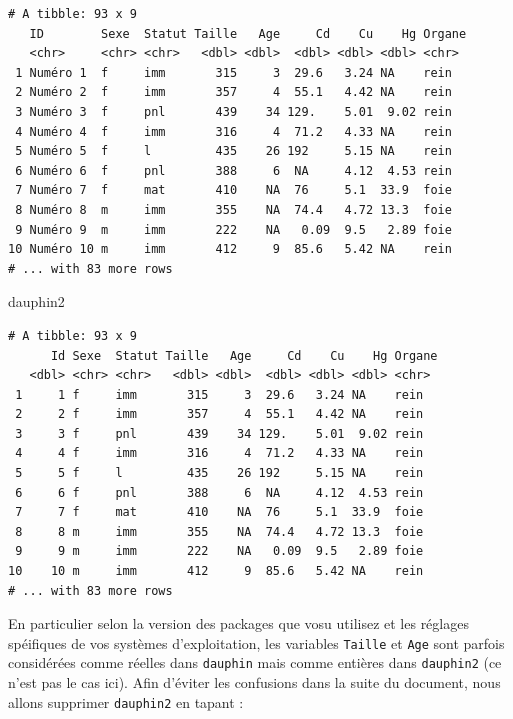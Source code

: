 \documentclass[
  a4paper,
]{article}
\newenvironment{Shaded}{\begin{snugshade}}{\end{snugshade}}
\newcommand{\NormalTok}[1]{\textcolor[rgb]{0.12,0.11,0.11}{#1}}
\begin{document}
\begin{verbatim}
# A tibble: 93 x 9
   ID        Sexe  Statut Taille   Age     Cd    Cu    Hg Organe
   <chr>     <chr> <chr>   <dbl> <dbl>  <dbl> <dbl> <dbl> <chr> 
 1 Numéro 1  f     imm       315     3  29.6   3.24 NA    rein  
 2 Numéro 2  f     imm       357     4  55.1   4.42 NA    rein  
 3 Numéro 3  f     pnl       439    34 129.    5.01  9.02 rein  
 4 Numéro 4  f     imm       316     4  71.2   4.33 NA    rein  
 5 Numéro 5  f     l         435    26 192     5.15 NA    rein  
 6 Numéro 6  f     pnl       388     6  NA     4.12  4.53 rein  
 7 Numéro 7  f     mat       410    NA  76     5.1  33.9  foie  
 8 Numéro 8  m     imm       355    NA  74.4   4.72 13.3  foie  
 9 Numéro 9  m     imm       222    NA   0.09  9.5   2.89 foie  
10 Numéro 10 m     imm       412     9  85.6   5.42 NA    rein  
# ... with 83 more rows
\end{verbatim}

\begin{Shaded}
\begin{Highlighting}[]
\NormalTok{dauphin2}
\end{Highlighting}
\end{Shaded}

\begin{verbatim}
# A tibble: 93 x 9
      Id Sexe  Statut Taille   Age     Cd    Cu    Hg Organe
   <dbl> <chr> <chr>   <dbl> <dbl>  <dbl> <dbl> <dbl> <chr> 
 1     1 f     imm       315     3  29.6   3.24 NA    rein  
 2     2 f     imm       357     4  55.1   4.42 NA    rein  
 3     3 f     pnl       439    34 129.    5.01  9.02 rein  
 4     4 f     imm       316     4  71.2   4.33 NA    rein  
 5     5 f     l         435    26 192     5.15 NA    rein  
 6     6 f     pnl       388     6  NA     4.12  4.53 rein  
 7     7 f     mat       410    NA  76     5.1  33.9  foie  
 8     8 m     imm       355    NA  74.4   4.72 13.3  foie  
 9     9 m     imm       222    NA   0.09  9.5   2.89 foie  
10    10 m     imm       412     9  85.6   5.42 NA    rein  
# ... with 83 more rows
\end{verbatim}

En particulier selon la version des packages que vosu utilisez et les réglages spéifiques de vos systèmes d'exploitation, les variables \texttt{Taille} et \texttt{Age} sont parfois considérées comme réelles dans \texttt{dauphin} mais comme entières dans \texttt{dauphin2} (ce n'est pas le cas ici). Afin d'éviter les confusions dans la suite du document, nous allons supprimer \texttt{dauphin2} en tapant :
\end{document}
